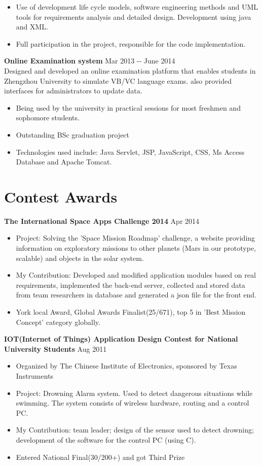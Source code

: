 \documentclass[margin]{res}
\begin{document}
\begin{resume}
\begin{itemize}
  \item Use of development life cycle models, software engineering methods and UML tools for requirements analysis and detailed design. Development using java and XML.
  \item Full participation in the project, responsible for the code implementation.
\end{itemize}
{\bf Online Examination system} \hfill Mar 2013 -­‐ June 2014\\
Designed and developed an online examination platform that enables students in
Zhengzhou University to simulate VB/VC language exams. also provided interfaces
for administrators to update data. 
\begin{itemize} 
  \item Being used by the university in practical sessions for most
freshmen and sophomore students.
  \item Outstanding BSc graduation project
  \item Technologies used
include: Java Servlet, JSP, JavaScript, CSS, Ms Access Database and Apache
Tomcat.
\end{itemize}
\section{Contest Awards}   
{\bf The International Space Apps Challenge 2014}  \hfill Apr 2014
\begin{itemize} \itemsep -2pt
  \item Project: Solving the 'Space Mission Roadmap' challenge, a website
  providing information on exploratory missions to other planets (Mars in our
  prototype, scalable) and objects in the solar system.
  \item My Contribution: Developed and modified application modules based on
  real requirements, implemented the back-end server, collected and
  stored data from team researchers in database and generated a json file for
  the front end.
  \item York local Award, Global Awards Finalist(25/671), top 5 in 'Best Mission
  Concept' category globally.
\end{itemize}
{\bf IOT(Internet of Things) Application Design Contest for
National University Students} \hspace{\fill} Aug 2011\\  
\begin{itemize} \itemsep -2pt
  \item Organized by The
Chinese Institute of Electronics, sponsored by Texas Instruments
   \item Project: Drowning Alarm system. Used to detect dangerous situations
   while swimming. The system consists of wireless hardware, routing and a
   control PC.
   \item My Contribution: team leader; design of the sensor used to detect
   drowning; development of the software for the control PC (using C).
   \item Entered National Final(30/200+) and got Third Prize
 \end{itemize}  

\end{resume}
\end{document}
